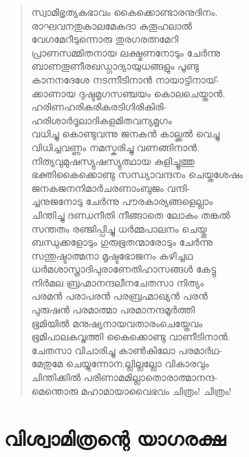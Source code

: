 \begin{verse}
സ്വാമിഭൃത്യകഭാവം കൈക്കൊണ്ടാരനുദിനം.\\
രാഘവനതുകാലമേകദാ കുതൂഹലാല്‍\\
വേഗമേറീടുന്നൊരു തുരഗരത്നമേറി\\
പ്രാണസമ്മിതനായ ലക്ഷ്മണനോടും ചേര്‍ന്നു\\
ബാണതൂണീരഖഡ്ഗാദ്യായുധങ്ങളും പൂണ്ടു\\
കാനനദേശേ നടന്നീടിനാന്‍ നായാട്ടിനായ്-\\
ക്കാണായ ദുഷ്ടമൃഗസഞ്ചയം കൊലചെയ്താന്‍.\\
ഹരിണഹരികരികരടിഗിരികിരി-\\
ഹരിശാര്‍ദൂലാദികളമിതവന്യമൃഗം\\
വധിച്ചു കൊണ്ടുവന്നു ജനകന്‍ കാല്ക്കല്‍ വെച്ചു\\
വിധിച്ചവണ്ണം നമസ്കരിച്ചു വണങ്ങിനാന്‍.\\
നിത്യവുമുഷസ്യുഷസ്യുത്ഥായ കുളിച്ചൂത്തു\\
ഭക്തികൈക്കൊണ്ടു സന്ധ്യാവന്ദനം ചെയ്തശേഷം\\
ജനകജനനിമാര്‍ചരണാംബുജം വന്ദി-\\
ച്ചനുജനോടു ചേര്‍ന്നു പൗരകാര്യങ്ങളെല്ലാം\\
ചിന്തിച്ചു ദണ്ഡനീതി നീങ്ങാതെ ലോകം തങ്കല്‍\\
സന്തതം രഞ്ജിപ്പിച്ചു ധര്‍മ്മപാലനം ചെയ്തു\\
ബന്ധുക്കളോടും ഗുരുഭൂതന്മാരോടും ചേര്‍ന്നു\\
സന്തുഷ്ടാത്മനാ മൃഷ്ടഭോജനം കഴിച്ചഥ\\
ധര്‍മശാസ്ത്രാദിപുരാണേതിഹാസങ്ങള്‍ കേട്ടു\\
നിര്‍മല ബ്രഹ്മാനന്ദലീനചേതസാ നിത്യം\\
പരമന്‍ പരാപരന്‍ പരബ്രഹ്മാഖ്യന്‍ പരന്‍\\
പുരുഷന്‍ പരമാത്മാ പരമാനന്ദമൂര്‍ത്തി\\
ഭൂമിയില്‍ മനുഷ്യനായവതാരംചെയ്തേവം\\
ഭൂമിപാലകവൃത്തി കൈക്കൊണ്ടു വാണീടിനാന്‍.\\
ചേതസാ വിചാരിച്ചു കാണ്‍കിലോ പരമാര്‍ഥ-\\
മേതുമേ ചെയ്യുന്നോന,ല്ലില്ലല്ലോ വികാരവും\\
ചിന്തിക്കില്‍ പരിണാമമില്ലാതൊരാത്മാനന്ദ-\\
മെന്തൊരു മഹാമായാവൈഭവം ചിത്രം! ചിത്രം!
\end{verse}


\section{വിശ്വാമിത്രന്റെ യാഗരക്ഷ}

